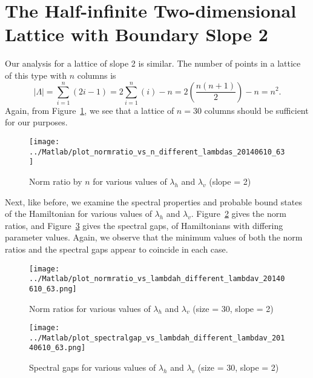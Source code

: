 \documentclass{article}
\numberwithin{equation}{section}
\numberwithin{theorem}{section}
\numberwithin{proposition}{section}
\numberwithin{lemma}{section}
\numberwithin{corollary}{section}
\numberwithin{definition}{section}
\begin{document}
\section[The Half-infinite Two-dimensional Lattice with \\ Boundary Slope~2]{\sloppy The Half-infinite Two-dimensional Lattice with Bound\-a\-ry Slope 2}

Our analysis for a lattice of slope 2 is similar. The number of points in a lattice of this type with $n$ columns is
\begin{equation}
	|\Lambda| = \sum_{i=1}^n (2i-1) = 2\sum_{i=1}^n (i) - n = 2 \left( \frac{n(n+1)}{2} \right) - n = n^2.
\end{equation}
Again, from Figure~\ref{fig:63howbig}, we see that a lattice of $n = 30$ columns should be sufficient for our purposes.

\begin{figure}[p!]
	\centering
	\caption{Norm ratio by $n$ for various values of $\lambda_h$ and $\lambda_v$ (slope = 2)	\label{fig:63howbig}}
	\texttt{[image: ../Matlab/plot\_normratio\_vs\_n\_different\_lambdas\_20140610\_63]}	
\end{figure}

Next, like before, we examine the spectral properties and probable bound states of the Hamiltonian for various values of $\lambda_h$ and $\lambda_v$. Figure~\ref{fig:63normratios} gives the norm ratios, and Figure~\ref{fig:63spectralgaps} gives the spectral gaps, of Hamiltonians with differing parameter values. Again, we observe that the minimum values of both the norm ratios and the spectral gaps appear to coincide in each case.

\begin{figure}[p!]
	\centering
	\caption{Norm ratios for various values of $\lambda_h$ and $\lambda_v$ (size = 30, slope = 2)	\label{fig:63normratios}}
	\texttt{[image: ../Matlab/plot\_normratio\_vs\_lambdah\_different\_lambdav\_20140610\_63.png]}
\end{figure}

\begin{figure}[p!]
	\centering
	\caption{Spectral gaps for various values of $\lambda_h$ and $\lambda_v$ (size = 30, slope = 2)	\label{fig:63spectralgaps}}
	\texttt{[image: ../Matlab/plot\_spectralgap\_vs\_lambdah\_different\_lambdav\_20140610\_63.png]}
\end{figure}
\end{document}
